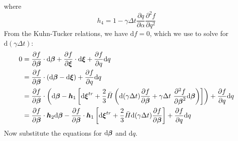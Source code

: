 \documentclass[10pt]{article}
\begin{document}
where
\begin{equation}
h_4 = {1 - \gamma\Delta t \frac{\partial q}{\partial \alpha}\frac{\partial^2 f}{\partial q^2}}
\end{equation}
From the Kuhn-Tucker relations, we have $\mathrm{d}f = 0$, which we use to solve for $\mathrm{d}(\gamma \Delta t)$:
\begin{equation}
\begin{aligned}
0 &=
\frac{\partial f}{\partial \mbox{\boldmath$\beta$}}\cdot\mathrm{d}\mbox{\boldmath$\beta$}
+ \frac{\partial f}{\partial \mbox{\boldmath$\xi$}}\cdot\mathrm{d}\mbox{\boldmath$\xi$}
+ \frac{\partial f}{\partial q}\mathrm{d}q\\
&=
\frac{\partial f}{\partial \mbox{\boldmath$\beta$}}\cdot
\left(\mathrm{d}\mbox{\boldmath$\beta$}
- \mathrm{d}\mbox{\boldmath$\xi$}\right)
+ \frac{\partial f}{\partial q}\mathrm{d}q\\
&=
\frac{\partial f}{\partial \mbox{\boldmath$\beta$}}\cdot
\left(\mathrm{d}\mbox{\boldmath$\beta$}
- \mbox{\boldmath$ h$}_1
\left[
\mathrm{d}\mbox{\boldmath$\xi$}^{tr} + 
\frac{2}{3}\bar{H}\left(
\mathrm{d}(\gamma\Delta t)\frac{\partial f}{\partial\mbox{\boldmath$\beta$}}
+ 
\gamma\Delta t\
\frac{\partial^2 f}{\partial\mbox{\boldmath$\beta$}^2}
\mathrm{d}\mbox{\boldmath$\beta$}
\right)
\right] \right)
+ \frac{\partial f}{\partial q}\mathrm{d}q\\
&=
\frac{\partial f}{\partial \mbox{\boldmath$\beta$}}\cdot
\mbox{\boldmath$ h$}_2\mathrm{d}\mbox{\boldmath$\beta$}
- \frac{\partial f}{\partial \mbox{\boldmath$\beta$}}\cdot\mbox{\boldmath$ h$}_1
\left[
\mathrm{d}\mbox{\boldmath$\xi$}^{tr} + 
\frac{2}{3}\bar{H}
\mathrm{d}(\gamma\Delta t)\frac{\partial f}{\partial\mbox{\boldmath$\beta$}}
\right]
+ \frac{\partial f}{\partial q}\mathrm{d}q\\
\end{aligned}
\end{equation}
Now substitute the equations for $\mathrm{d}\mbox{\boldmath$\beta$}$ and $\mathrm{d}q$.
\end{document}
